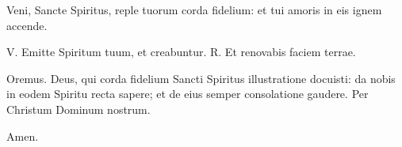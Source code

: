 Veni, Sancte Spiritus, reple tuorum corda fidelium: et tui amoris in eis ignem accende.

V. Emitte Spiritum tuum, et creabuntur.
R. Et renovabis faciem terrae.

Oremus. Deus, qui corda fidelium Sancti Spiritus illustratione docuisti: da nobis in eodem Spiritu recta sapere; et de eius semper consolatione gaudere. Per Christum Dominum nostrum.

Amen.
